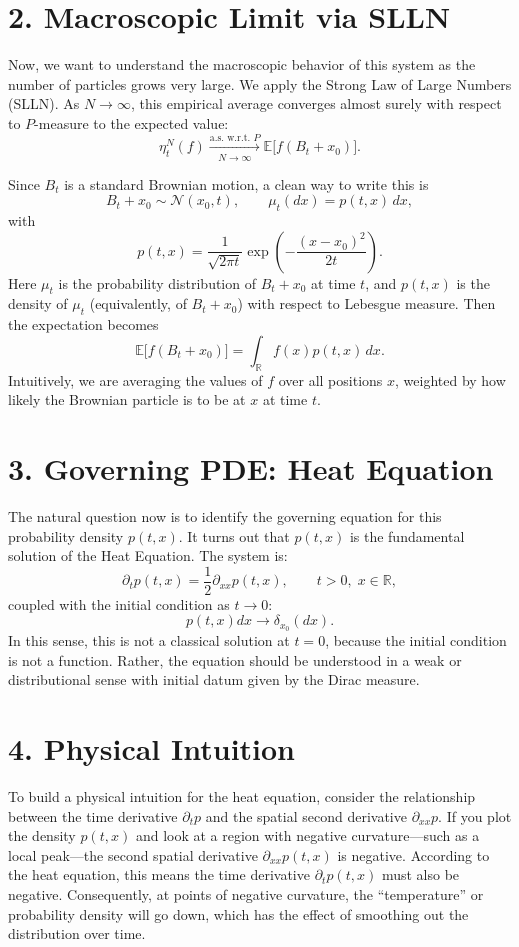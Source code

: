 \documentclass[11pt]{article}
\theoremstyle{definition}
\theoremstyle{remark}
\begin{document}
\section*{2. Macroscopic Limit via SLLN}
Now, we want to understand the macroscopic behavior of this system as the number of particles grows very large. We apply the Strong Law of Large Numbers (SLLN). As $N\to\infty$, this empirical average converges almost surely with respect to $P$-measure to the expected value:
\[
\eta_t^N(f)\xrightarrow[N\to\infty]{\text{a.s. w.r.t. }P}\mathbb{E}\bigl[f(B_t+x_0)\bigr].
\]

Since $B_t$ is a standard Brownian motion, a clean way to write this is
\[
B_t+x_0\sim \mathcal N(x_0,t),\qquad \mu_t(dx)=p(t,x)\,dx,
\]
with
\[
p(t,x)=\frac{1}{\sqrt{2\pi t}}\exp\!\left(-\frac{(x-x_0)^2}{2t}\right).
\]
Here $\mu_t$ is the probability distribution of $B_t+x_0$ at time $t$, and $p(t,x)$ is the density of $\mu_t$ (equivalently, of $B_t+x_0$) with respect to Lebesgue measure.
Then the expectation becomes
\[
\mathbb{E}\bigl[f(B_t+x_0)\bigr]=\int_{\mathbb{R}} f(x)p(t,x)\,dx.
\]
Intuitively, we are averaging the values of $f$ over all positions $x$, weighted by how likely the Brownian particle is to be at $x$ at time $t$.

\section*{3. Governing PDE: Heat Equation}
The natural question now is to identify the governing equation for this probability density $p(t,x)$. It turns out that $p(t,x)$ is the fundamental solution of the Heat Equation. The system is:
\[
\partial_t p(t,x)=\frac{1}{2}\partial_{xx}p(t,x),\qquad t>0,\;x\in\mathbb{R},
\]
coupled with the initial condition as $t\to0$:
\[
p(t,x)dx\to\delta_{x_0}(dx).
\]
In this sense, this is not a classical solution at $t=0$, because the initial condition is not a function. Rather, the equation should be understood in a weak or distributional sense with initial datum given by the Dirac measure.

\section*{4. Physical Intuition}
To build a physical intuition for the heat equation, consider the relationship between the time derivative $\partial_t p$ and the spatial second derivative $\partial_{xx}p$. If you plot the density $p(t,x)$ and look at a region with negative curvature---such as a local peak---the second spatial derivative $\partial_{xx}p(t,x)$ is negative. According to the heat equation, this means the time derivative $\partial_t p(t,x)$ must also be negative. Consequently, at points of negative curvature, the ``temperature'' or probability density will go down, which has the effect of smoothing out the distribution over time.
\end{document}
